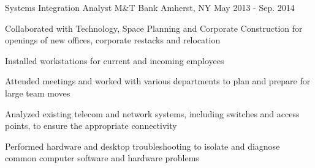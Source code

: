 \begin{cventries}
  \cventry
    {Systems Integration Analyst} %
    {M\&T Bank} %
    {Amherst, NY} %
    {May 2013 - Sep. 2014} %
    {
      \begin{cvitems} %
        \item {Collaborated with Technology, Space Planning and Corporate Construction for openings of new offices, corporate restacks and relocation}
        \item {Installed workstations for current and incoming employees}
        \item {Attended meetings and worked with various departments to plan and prepare for large team moves}
        \item {Analyzed existing telecom and network systems, including switches and access points, to ensure the appropriate connectivity}
        \item {Performed hardware and desktop troubleshooting to isolate and diagnose common computer software and hardware problems}
      \end{cvitems}
    }


\end{cventries}
